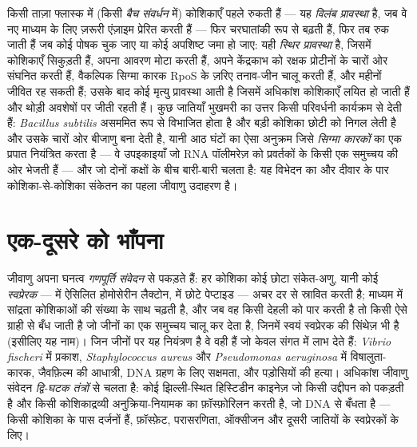 \begin{definition}[प्रावस्थाएँ और अवस्थाएँ]\label{def:b3:bacteriology:phases}
किसी ताज़ा फ्लास्क में (किसी \emph{बैच संवर्धन} में) कोशिकाएँ पहले रुकती
हैं --- यह \emph{विलंब प्रावस्था} है, जब वे नए माध्यम के लिए ज़रूरी
एंज़ाइम प्रेरित करती हैं --- फिर चरघातांकी रूप से बढ़ती हैं, फिर तब रुक
जाती हैं जब कोई पोषक चुक जाए या कोई अपशिष्ट जमा हो जाए: यही
\emph{स्थिर प्रावस्था} है, जिसमें कोशिकाएँ सिकुड़ती हैं, अपना आवरण मोटा
करती हैं, अपने केंद्रकाभ को रक्षक प्रोटीनों के चारों ओर संघनित करती
हैं, वैकल्पिक सिग्मा कारक RpoS के ज़रिए तनाव-जीन चालू करती हैं, और
महीनों जीवित रह सकती हैं; उसके बाद कोई मृत्यु प्रावस्था आती है जिसमें
अधिकांश कोशिकाएँ लयित हो जाती हैं और थोड़ी अवशेषों पर जीती रहती हैं।
कुछ जातियाँ भुखमरी का उत्तर किसी परिवर्धनी कार्यक्रम से देती हैं:
\emph{Bacillus subtilis} असममित रूप से विभाजित होता है और बड़ी कोशिका
छोटी को निगल लेती है और उसके चारों ओर बीजाणु बना देती है, यानी आठ
घंटों का ऐसा अनुक्रम जिसे \emph{सिग्मा कारकों} का एक प्रपात नियंत्रित
करता है --- वे उपइकाइयाँ जो RNA पॉलीमरेज़ को प्रवर्तकों के किसी एक
समुच्चय की ओर भेजती हैं --- और जो दोनों कक्षों के बीच बारी-बारी चलता है:
यह विभेदन का और दीवार के पार कोशिका-से-कोशिका संकेतन का पहला जीवाणु उदाहरण है।
\end{definition}

\section{एक-दूसरे को भाँपना}

\begin{definition}[गणपूर्ति संवेदन]\label{def:b3:bacteriology:quorum}
जीवाणु अपना घनत्व \emph{गणपूर्ति संवेदन} से पकड़ते हैं: हर कोशिका कोई
छोटा संकेत-अणु, यानी कोई \emph{स्वप्रेरक} ---  में
ऐसिलित होमोसेरीन लैक्टोन,  में छोटे पेप्टाइड ---
अचर दर से स्रावित करती है; माध्यम में सांद्रता कोशिकाओं की संख्या के
साथ चढ़ती है, और जब वह किसी देहली को पार करती है तो किसी ऐसे ग्राही से
बँध जाती है जो जीनों का एक समुच्चय चालू कर देता है, जिनमें स्वयं
स्वप्रेरक की सिंथेज़ भी है (इसीलिए यह नाम)। जिन जीनों पर यह नियंत्रण है
वे वही हैं जो केवल संगत में लाभ देते हैं: \emph{Vibrio fischeri} में
प्रकाश, \emph{Staphylococcus aureus} और \emph{Pseudomonas aeruginosa}
में विषालुता-कारक, जैवफ़िल्म की आधात्री, DNA ग्रहण के लिए सक्षमता, और
पड़ोसियों की हत्या। अधिकांश जीवाणु संवेदन
\emph{द्वि-घटक तंत्रों} से चलता है: कोई झिल्ली-स्थित हिस्टिडीन काइनेज़
जो किसी उद्दीपन को पकड़ती है और किसी कोशिकाद्रव्यी अनुक्रिया-नियामक का
फ़ॉस्फ़ोरिलन करती है, जो DNA से बँधता है --- किसी कोशिका के पास दर्जनों
हैं, फ़ॉस्फ़ेट, परासरणिता, ऑक्सीजन और दूसरी जातियों के स्वप्रेरकों के लिए।
\end{definition}

